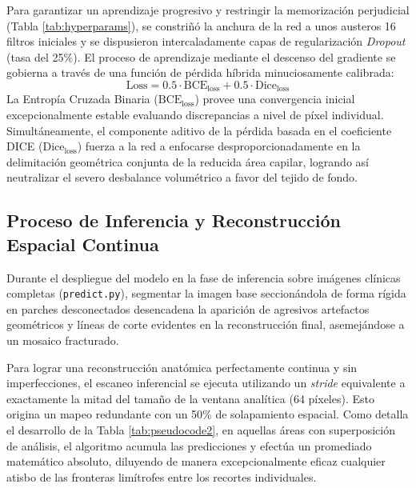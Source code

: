 \documentclass[conference]{IEEEtran}
\begin{document}
Para garantizar un aprendizaje progresivo y restringir la memorización perjudicial (Tabla \ref{tab:hyperparams}), se constriñó la anchura de la red a unos austeros 16 filtros iniciales y se dispusieron intercaladamente capas de regularización \textit{Dropout} (tasa del 25\%). El proceso de aprendizaje mediante el descenso del gradiente se gobierna a través de una función de pérdida híbrida minuciosamente calibrada:
\begin{equation}
\text{Loss} = 0.5 \cdot \text{BCE}_{\text{loss}} + 0.5 \cdot \text{Dice}_{\text{loss}}
\end{equation}
La Entropía Cruzada Binaria ($\text{BCE}_{\text{loss}}$) provee una convergencia inicial excepcionalmente estable evaluando discrepancias a nivel de píxel individual. Simultáneamente, el componente aditivo de la pérdida basada en el coeficiente DICE ($\text{Dice}_{\text{loss}}$) fuerza a la red a enfocarse desproporcionadamente en la delimitación geométrica conjunta de la reducida área capilar, logrando así neutralizar el severo desbalance volumétrico a favor del tejido de fondo.

\subsection{Proceso de Inferencia y Reconstrucción Espacial Continua}
Durante el despliegue del modelo en la fase de inferencia sobre imágenes clínicas completas (\texttt{predict.py}), segmentar la imagen base seccionándola de forma rígida en parches desconectados desencadena la aparición de agresivos artefactos geométricos y líneas de corte evidentes en la reconstrucción final, asemejándose a un mosaico fracturado. 

Para lograr una reconstrucción anatómica perfectamente continua y sin imperfecciones, el escaneo inferencial se ejecuta utilizando un \textit{stride} equivalente a exactamente la mitad del tamaño de la ventana analítica (64 píxeles). Esto origina un mapeo redundante con un 50\% de solapamiento espacial. Como detalla el desarrollo de la Tabla \ref{tab:pseudocode2}, en aquellas áreas con superposición de análisis, el algoritmo acumula las predicciones y efectúa un promediado matemático absoluto, diluyendo de manera excepcionalmente eficaz cualquier atisbo de las fronteras limítrofes entre los recortes individuales.
\end{document}
